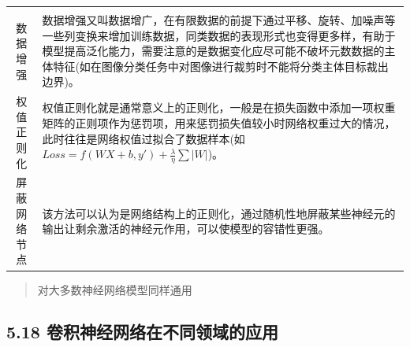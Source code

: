 \begin{longtable}[]{@{}cl@{}}
\begin{minipage}[t]{0.07\columnwidth}
\end{minipage}\tabularnewline
\begin{minipage}[t]{0.08\columnwidth}\centering\strut
数据增强\strut
\end{minipage} & \begin{minipage}[t]{0.07\columnwidth}\raggedright\strut
数据增强又叫数据增广，在有限数据的前提下通过平移、旋转、加噪声等一些列变换来增加训练数据，同类数据的表现形式也变得更多样，有助于模型提高泛化能力，需要注意的是数据变化应尽可能不破坏元数数据的主体特征(如在图像分类任务中对图像进行裁剪时不能将分类主体目标裁出边界)。\strut
\end{minipage}\tabularnewline
\begin{minipage}[t]{0.08\columnwidth}\centering\strut
权值正则化\strut
\end{minipage} & \begin{minipage}[t]{0.07\columnwidth}\raggedright\strut
权值正则化就是通常意义上的正则化，一般是在损失函数中添加一项权重矩阵的正则项作为惩罚项，用来惩罚损失值较小时网络权重过大的情况，此时往往是网络权值过拟合了数据样本(如\(Loss=f(WX+b,y')+\frac{\lambda}{\eta}\sum{|W|}\))。\strut
\end{minipage}\tabularnewline
\begin{minipage}[t]{0.08\columnwidth}\centering\strut
屏蔽网络节点\strut
\end{minipage} & \begin{minipage}[t]{0.07\columnwidth}\raggedright\strut
该方法可以认为是网络结构上的正则化，通过随机性地屏蔽某些神经元的输出让剩余激活的神经元作用，可以使模型的容错性更强。\strut
\end{minipage}\tabularnewline
\bottomrule
\end{longtable}

\begin{quote}
对大多数神经网络模型同样通用
\end{quote}

\subsection{5.18
卷积神经网络在不同领域的应用}\label{ux5377ux79efux795eux7ecfux7f51ux7edcux5728ux4e0dux540cux9886ux57dfux7684ux5e94ux7528}

